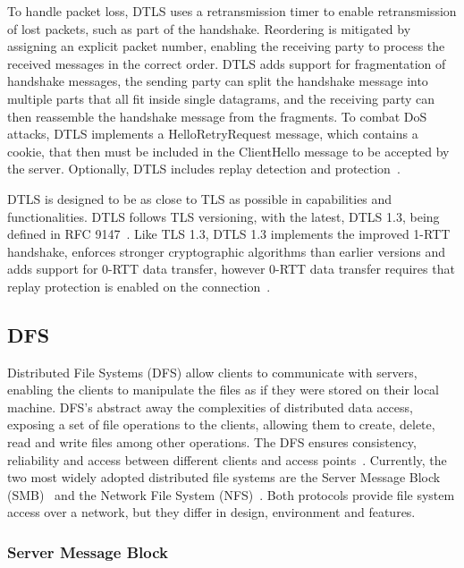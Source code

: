 \documentclass[english, 12pt, a4paper, elec, utf8, a-2b, online]{aaltothesis}
\begin{document}
To handle packet loss, DTLS uses a retransmission timer to enable retransmission of
lost packets, such as part of the handshake. Reordering is mitigated by assigning
an explicit packet number, enabling the receiving party to process the received
messages in the correct order. DTLS adds support for fragmentation of handshake messages,
the sending party can split the handshake message into multiple parts that all fit
inside single datagrams, and the receiving party can then reassemble the handshake message
from the fragments. To combat DoS attacks,  DTLS implements a HelloRetryRequest message,
which contains a cookie, that then must be included in the ClientHello message
to be accepted by the server. Optionally, DTLS includes replay detection and protection~\cite{rfc9147}.

DTLS is designed to be as close to TLS as possible in capabilities and functionalities.
DTLS follows TLS versioning, with the latest, DTLS 1.3, being defined in RFC 9147~\cite{rfc9147}.
Like TLS 1.3, DTLS 1.3 implements the improved 1-RTT handshake, enforces stronger
cryptographic algorithms than earlier versions and adds support for 0-RTT data transfer,
however 0-RTT data transfer requires that replay protection is enabled on the connection~\cite{rfc9147}.

\subsection{DFS}

Distributed File Systems (DFS) allow clients to communicate with servers, enabling
the clients to manipulate the files as if they were stored on their local machine.
DFS's abstract away the complexities of distributed data access, exposing a set
of file operations to the clients, allowing them to create, delete, read and write files among other operations.
The DFS ensures consistency, reliability and access between different
clients and access points~\cite{os_concepts}. Currently, the two most widely adopted
distributed file systems are the Server Message Block (SMB)~\cite{smb2} and the
Network File System (NFS)~\cite{rfc7530}. Both protocols provide file system access
over a network, but they differ in design, environment and features.

\subsubsection{Server Message Block}
\end{document}
